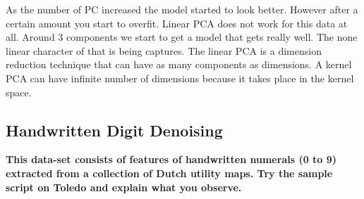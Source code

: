 \documentclass[11pt,oneside,a4paper]{article}
\begin{document}
As the number of PC increased the model started to look better. However after a certain amount you start to overfit. Linear PCA does not work for this data at all. Around 3 components we start to get a model that gets really well. The none linear character of that is being captures. The linear PCA is a dimension reduction technique that can have as many components as dimensions. A kernel PCA can have infinite number of dimensions because it takes place in the kernel space. 

\subsection{Handwritten Digit Denoising}

\textbf{This data-set consists of features of handwritten numerals (0 to 9) extracted from a collection of Dutch utility maps. Try the sample script on Toledo and explain what you observe.}\\
\end{document}
